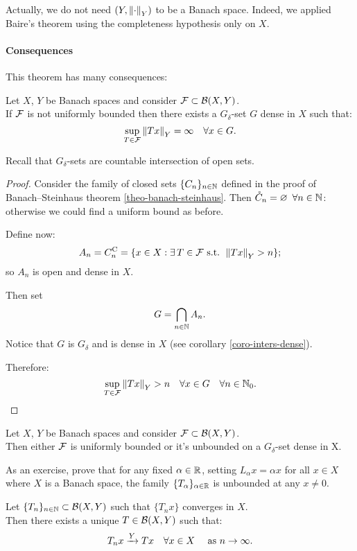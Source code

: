 Actually, we do not need $(Y, \left\lVert\cdot\right\rVert_Y)$ to be a Banach space. Indeed, we applied Baire's theorem using the completeness hypothesis only on $X$.

\paragraph{Consequences} This theorem has many consequences:

\begin{coro}
	Let $X$, $Y$ be Banach spaces and consider $\mathcal F \subset \mathcal B(X,Y)$.\\
	If $\mathcal F$ is not uniformly bounded then there exists a $G_\delta$-set $G$ dense in $X$ such that:
	$$ \sup_{T \in \mathcal F} \left\lVert Tx\right\rVert_Y = \infty \quad \forall x \in G.$$
\end{coro}

Recall that $G_\delta$-sets are countable intersection of open sets.

\begin{proof}
	Consider the family of closed sets $\{C_n\}_{n\in \mathbb N}$ defined in the proof of Banach--Steinhaus theorem \vref{theo-banach-steinhaus}. Then $\mathring{C}_n= \varnothing \enspace \forall n \in \mathbb N$: otherwise we could find a uniform bound as before.
	
	Define now:
	$$ A_n = C_n^{\mathrm{C}} = \{x\in X : \exists \, T\in \mathcal F \text{ s.t. } \left\lVert Tx\right\rVert_Y > n\};$$
	so $A_n$ is open and dense in $X$.
	
	Then set 
	$$G = \bigcap_{n\in\mathbb N} A_n.$$
	Notice that $G$ is $G_\delta$ and is dense in $X$ (see corollary \vref{coro-inters-dense}).
	
	Therefore:
	$$\sup_{T \in \mathcal F}\left\lVert Tx\right\rVert_Y > n \quad \forall x \in G \quad \forall n \in \mathbb N_0.$$
\end{proof}

\begin{theo}
	Let $X$, $Y$ be Banach spaces and consider $\mathcal F \subset \mathcal B(X,Y)$. \\
	Then either $\mathcal F$ is uniformly bounded or it's unbounded on a $G_\delta$-set dense in X.
\end{theo}

As an exercise, prove that for any fixed $\alpha \in \mathbb R$, setting $L_\alpha x= \alpha x$ for all $x \in X$ where $X$ is a Banach space, the family $\{T_\alpha\}_{\alpha \in \mathbb R}$ is unbounded at any $x \neq 0$.

\begin{coro} \label{coro-UBP-conv}
	Let $\{T_n\}_{n\in\mathbb N}\subset\mathcal B(X,Y)$ such that $\{T_n x\}$ converges in $X$. \\
	Then there exists a unique $T \in \mathcal B(X,Y)$ such that: $$T_n x \xrightarrow{Y} Tx \quad \forall x \in X \quad \text{ as } n \to \infty.$$
\end{coro}


